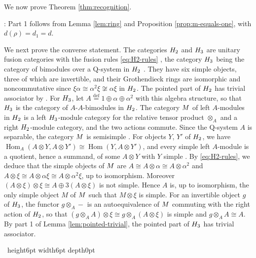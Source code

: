 \documentclass[leqno]{article}
\newcommand{\Q}{\mathrm{Q}}
\let\cal\relax
\newcommand{\cal}{\mathcal}
\newcommand{\qed}{\hfill \vrule height6pt  width6pt depth0pt}
\newcommand{\ot}{\otimes}
\newcommand{\ov}{\overset}
\newenvironment{proof}[1][]{\noindent {\it Proof #1} : }{\hbox{~}\qed
\smallskip
}
\numberwithin{equation}{section}
\begin{document}
We now prove Theorem \ref{thm:recognition}.

\begin{proof}
Part 1 follows from Lemma \ref{lem:ring} and Proposition \ref{prop:m-equals-one}, with $d(\rho) = d_1 = d$.

We next prove the converse statement. The categories $\cal H_2$ and $\cal H_3$ are unitary fusion categories with the fusion rules \eqref{eq:H2-rules} \cite[p.~14, Theorem 1.4 p.~4 and Corollary 3.24 p.~24]{GrS12}, the category $\cal H_3$ being the category of bimodules over a $\Q$-system in $\cal H_2$ \cite[Lemma 3.14 p.~21 and Definition 3.19 p.~23]{GrS12}. They have six simple objects, three of which are invertible, and their Grothendieck rings are isomorphic and noncommutative since $\xi\alpha \cong \alpha^2\xi \not\cong \alpha\xi$ in $\cal H_2$. The pointed part of $\cal H_2$ has trivial associator by \cite[Lemma 2.21 p.~15]{GrS12}. For $\cal H_3$, let $A \ov{\mathrm{def}}{=} 1 \oplus \alpha \oplus \alpha^2$ with this algebra structure, so that $\cal H_3$ is the category of $A$-$A$-bimodules in $\cal H_2$. The category $\cal M$ of left $A$-modules in $\cal H_2$ is a left $\cal H_3$-module category for the relative tensor product $\ot_A$ and a right $\cal H_2$-module category, and the two actions commute. Since the $\Q$-system $A$ is separable, the category $\cal M$ is semisimple \cite[Proposition 2.7 p.~5]{DMNO13}. For objects $Y$, $Y'$ of $\cal H_2$, we have $\operatorname{Hom}_A(A \ot Y,A \ot Y') \cong \operatorname{Hom}(Y,A \ot Y')$, and every simple left $A$-module is a quotient, hence a summand, of some $A \ot Y$ with $Y$ simple \cite[Lemma 4 p.~9]{Ost03}. By \eqref{eq:H2-rules}, we deduce that the simple objects of $\cal M$ are $A \cong A \ot \alpha \cong A \ot \alpha^2$ and $A \ot \xi \cong A \ot \alpha\xi \cong A \ot \alpha^2\xi$, up to isomorphism. Moreover $(A \ot \xi) \ot \xi \cong A \oplus 3(A \ot \xi)$ is not simple. Hence $A$ is, up to isomorphism, the only simple object $M$ of $\cal M$ such that $M \ot \xi$ is simple. For an invertible object $g$ of $\cal H_3$, the functor $g \ot_A -$ is an autoequivalence of $\cal M$ commuting with the right action of $\cal H_2$, so that $(g \ot_A A) \ot \xi \cong g \ot_A (A \ot \xi)$ is simple and $g \ot_A A \cong A$. By part 1 of Lemma \ref{lem:pointed-trivial}, the pointed part of $\cal H_3$ has trivial associator.


\end{proof}
\end{document}
